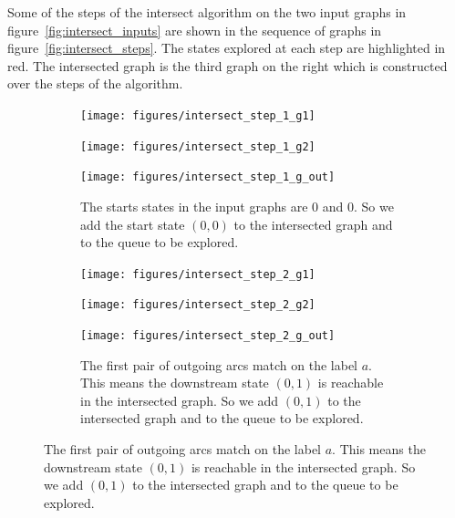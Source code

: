 

Some of the steps of the intersect algorithm on the two input graphs in
figure~\ref{fig:intersect_inputs} are shown in the sequence of graphs in
figure~\ref{fig:intersect_steps}. The states explored at each step are
highlighted in red. The intersected graph is the third graph on the right which
is constructed over the steps of the algorithm.

\begin{figure}
    \begin{subfigure}{\linewidth}
        \begin{minipage}{0.22\textwidth}
            \centering
            \texttt{[image: figures/intersect\_step\_1\_g1]}
        \end{minipage}
        \begin{minipage}{0.37\textwidth}
            \centering
            \texttt{[image: figures/intersect\_step\_1\_g2]}
        \end{minipage}
        \begin{minipage}{0.37\textwidth}
            \centering
            \texttt{[image: figures/intersect\_step\_1\_g\_out]}
        \end{minipage}
        \caption{The starts states in the input graphs are $0$ and $0$. So we
        add the start state $(0, 0)$ to the intersected graph and to the queue
        to be explored.}
    \end{subfigure}

    \begin{subfigure}{\linewidth}
        \begin{minipage}{0.22\textwidth}
            \centering
            \texttt{[image: figures/intersect\_step\_2\_g1]}
        \end{minipage}
        \begin{minipage}{0.37\textwidth}
            \centering
            \texttt{[image: figures/intersect\_step\_2\_g2]}
        \end{minipage}
        \begin{minipage}{0.37\textwidth}
            \centering
            \texttt{[image: figures/intersect\_step\_2\_g\_out]}
        \end{minipage}
        \caption{The first pair of outgoing arcs match on the label $a$. This
        means the downstream state $(0, 1)$ is reachable in the intersected
        graph. So we add $(0, 1)$ to the intersected graph and to the queue to
        be explored.}
    \end{subfigure}


\end{figure}
